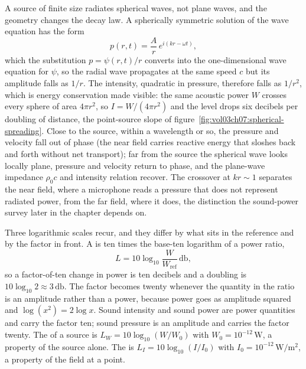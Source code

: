 A source of finite size radiates spherical waves, not plane waves, and
the geometry changes the decay law. A spherically symmetric solution of
the wave equation has the form
\[
p(r, t) = \frac{A}{r}\,e^{i(kr - \omega t)},
\]
which the substitution $p = \psi(r,t)/r$ converts into the
one-dimensional wave equation for $\psi$, so the radial wave propagates
at the same speed $c$ but its amplitude falls as $1/r$. The intensity,
quadratic in pressure, therefore falls as $1/r^2$, which is energy
conservation made visible: the same acoustic power $W$ crosses every
sphere of area $4\pi r^2$, so $I = W/(4\pi r^2)$ and the level drops six
decibels per doubling of distance, the point-source slope of
figure~\ref{fig:vol03ch07:spherical-spreading}. Close to the source,
within a wavelength or so, the pressure and velocity fall out of phase
(the near field carries reactive energy that sloshes back and forth
without net transport); far from the source the spherical wave looks
locally plane, pressure and velocity return to phase, and the
plane-wave impedance $\rho_0 c$ and intensity relation recover. The
crossover at $kr\sim 1$ separates the near field, where a microphone
reads a pressure that does not represent radiated power, from the far
field, where it does, the distinction the sound-power survey later in the
chapter depends on.



Three logarithmic scales recur, and they differ by what sits in the
reference and by the factor in front. A  is ten times
the base-ten logarithm of a power ratio,
\[
L = 10\log_{10}\frac{W}{W_{\text{ref}}}\,\si{\decibel},
\]
so a factor-of-ten change in power is ten decibels and a doubling is
$10\log_{10}2 \approx 3\,\si{\decibel}$. The factor becomes twenty
whenever the quantity in the ratio is an amplitude rather than a power,
because power goes as amplitude squared and $\log(x^2) = 2\log x$. Sound
intensity and sound power are power quantities and carry the factor ten;
sound pressure is an amplitude and carries the factor twenty. The
 of a source is
$L_W = 10\log_{10}(W/W_0)$ with $W_0 = 10^{-12}\,\si{\watt}$, a property
of the source alone. The  is
$L_I = 10\log_{10}(I/I_0)$ with $I_0 = 10^{-12}\,\si{\watt\per
\meter\squared}$, a property of the field at a point.

